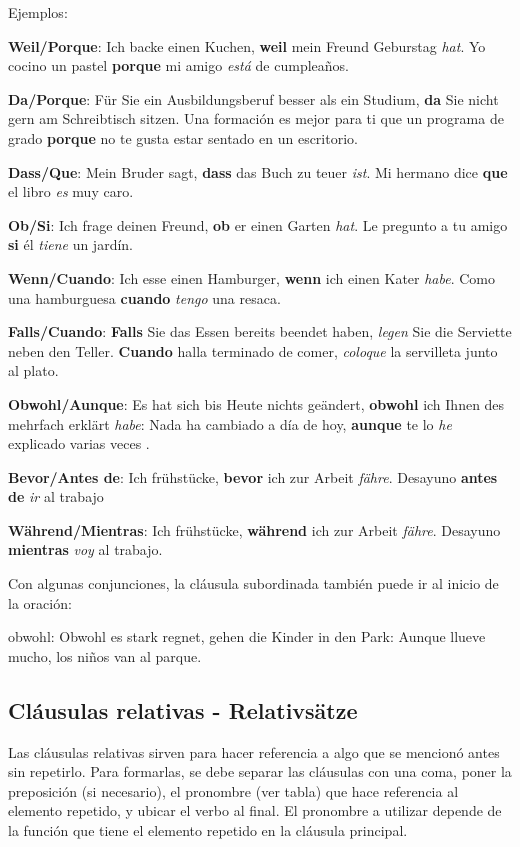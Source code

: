 Ejemplos: 
\begin{myitemize}
\item \textbf{Weil/Porque}: Ich backe einen Kuchen, \textbf{weil} mein Freund Geburstag \textit{hat}. Yo cocino un pastel \textbf{porque} mi amigo \textit{está} de cumpleaños.
\item \textbf{Da/Porque}: Für Sie ein Ausbildungsberuf besser als ein Studium, \textbf{da} Sie nicht gern am Schreibtisch sitzen. Una formación es mejor para ti que un programa de grado \textbf{porque} no te gusta estar sentado en un escritorio.
\item \textbf{Dass/Que}: Mein Bruder sagt, \textbf{dass} das Buch zu teuer \textit{ist}. Mi hermano dice \textbf{que} el libro \textit{es} muy caro.
\item \textbf{Ob/Si}: Ich frage deinen Freund, \textbf{ob} er einen Garten \textit{hat}. Le pregunto a tu amigo \textbf{si} él \textit{tiene} un jardín.
\item \textbf{Wenn/Cuando}: Ich esse einen Hamburger, \textbf{wenn} ich einen Kater \textit{habe}. Como una hamburguesa \textbf{cuando} \textit{tengo} una resaca.
\item \textbf{Falls/Cuando}: \textbf{Falls} Sie das Essen bereits beendet haben, \textit{legen} Sie die Serviette neben den Teller. \textbf{Cuando} halla terminado de comer, \textit{coloque} la servilleta junto al plato.
\item \textbf{Obwohl/Aunque}: Es hat sich bis Heute nichts geändert, \textbf{obwohl} ich Ihnen des mehrfach erklärt \textit{habe}: Nada ha cambiado a día de hoy, \textbf{aunque} te lo \textit{he} explicado varias veces .
\item \textbf{Bevor/Antes de}: Ich frühstücke, \textbf{bevor} ich zur Arbeit \textit{fähre}. Desayuno \textbf{antes de} \textit{ir} al trabajo
\item \textbf{Während/Mientras}: Ich frühstücke, \textbf{während} ich zur Arbeit \textit{fähre}. Desayuno \textbf{mientras} \textit{voy} al trabajo.
\end{myitemize}

Con algunas conjunciones, la cláusula subordinada también puede ir al inicio de la oración:
\begin{myitemize}
\item obwohl: Obwohl es stark regnet, gehen die Kinder in den Park: Aunque llueve mucho, los niños van al parque.
\end{myitemize}

\subsection{Cláusulas relativas - Relativsätze}
Las cláusulas relativas sirven para hacer referencia a algo que se mencionó antes sin repetirlo. Para formarlas, se debe separar las cláusulas con una coma, poner la preposición (si necesario), el pronombre (ver tabla) que hace referencia al elemento repetido, y ubicar el verbo al final. El pronombre a utilizar depende de la función que tiene el elemento repetido en la cláusula principal.

